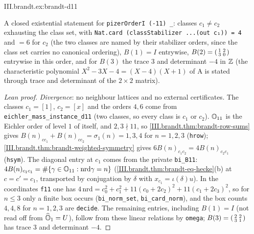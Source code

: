 \begin{tfformal}{III.brandt.ex:brandt-d11}
\begin{tffidelity}
A closed existential statement for \texttt{pizerOrderI (-11) \_}: classes $c_1\neq c_2$ exhausting the class set, with \texttt{Nat.card (classStabilizer ...(out c₁)) = 4} and $=6$ for $c_2$ (the two classes are named by their stabilizer orders, since the class set carries no canonical ordering), $B(1)=I$ entrywise, $B(2)=\begin{psmallmatrix}1&2\\3&0\end{psmallmatrix}$ entrywise in this order, and for $B(3)$ the trace $3$ and determinant $-4$ in $\mathbb{Z}$ (the characteristic polynomial $X^2-3X-4=(X-4)(X+1)$ of A is stated through trace and determinant of the $2\times 2$ matrix).
\end{tffidelity}
\end{tfformal}
\begin{proof}[Lean proof]
\emph{Divergence}: no neighbour lattices and no external certificates. The classes $c_1=[1]$, $c_2=[x]$ and the orders $4,6$ come from \texttt{eichler\_mass\_instance\_d11} (two classes, so every class is $c_1$ or $c_2$). $\mathbb{O}_{11}$ is the Eichler order of level $1$ of itself, and $2,3\nmid11$, so \cref{III.brandt.thm:brandt-row-sums} gives $B(n)_{cc_1}+B(n)_{cc_2}=\sigma_1(n)=1,3,4$ for $n=1,2,3$ (\texttt{hrow}); \cref{III.brandt.thm:brandt-weighted-symmetry} gives $6B(n)_{c_1c_2}=4B(n)_{c_2c_1}$ (\texttt{hsym}). The diagonal entry at $c_1$ comes from the private \texttt{bi\_B11}: $4B(n)_{c_1c_1}=\#\{\gamma\in\mathbb{O}_{11}:\mathrm{nrd}\gamma=n\}$ (\cref{III.brandt.thm:brandt-eq-hecke}(b) at $c=c'=c_1$, transported by conjugation by $\delta$ with $x_{c_1}=\iota(\delta)u$). In the coordinates \texttt{f11} one has $4\,\mathrm{nrd}=c_0^2+c_1^2+11(c_0+2c_2)^2+11(c_1+2c_3)^2$, so for $n\le3$ only a finite box occurs (\texttt{bi\_norm\_set}, \texttt{bi\_card\_norm}), and the box counts $4,4,8$ for $n=1,2,3$ are \texttt{decide}. The remaining entries, including $B(1)=I$ (not read off from $\widehat{\mathbb{O}}_1=U$), follow from these linear relations by \texttt{omega}; $B(3)=\begin{psmallmatrix}2&2\\3&1\end{psmallmatrix}$ has trace $3$ and determinant $-4$.
\end{proof}


